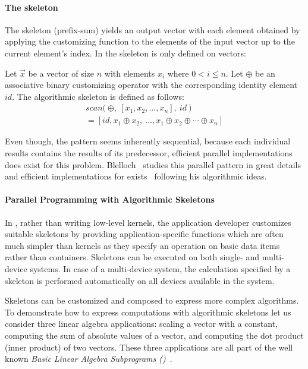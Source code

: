 \paragraph{The \scan skeleton}
The \scan skeleton (\aka prefix-sum) yields an output vector with each element obtained by applying the customizing function to the elements of the input vector up to the current element's index.
In \SkelCL the \scan skeleton is only defined on vectors:
\begin{definition}
  \label{definition:scan}
  Let $\vec{x}$ be a vector of size $n$ with elements $x_i$ where $0 < i \leq n$.
  Let $\oplus$ be an associative binary customizing operator with the corresponding identity element $id$.
  The algorithmic skeleton \scan is defined as follows:
  \begin{equation}
    \begin{split}
    scan \big(\ \oplus,\ [x_1, x_2, \dots, x_n],\ id\ \big) \\
      = [id, x_1 \oplus x_2,\ \dots,x_1 \oplus x_2 \oplus \cdots \oplus x_n]
    \end{split}
  \end{equation}
\end{definition}
\noindent
Even though, the \scan pattern seems inherently sequential, because each individual results contains the results of its predecessor, efficient parallel implementations does exist for this problem.
Blelloch~\cite{Blelloch1991} studies this parallel pattern in great details and efficient implementations for \GPUs exists~\cite{HarrisSeOw2007} following his algorithmic ideas.


\paragraph{Parallel Programming with Algorithmic Skeletons}
In \SkelCL, rather than writing low-level kernels, the application developer customizes suitable skeletons by providing application-specific functions which are often much simpler than kernels as they specify an operation on basic data items rather than containers.
Skeletons can be executed on both single- and multi-device systems.
In case of a multi-device system, the calculation specified by a skeleton is performed automatically on all devices available in the system.

Skeletons can be customized and composed to express more complex algorithms.
To demonstrate how to express computations with algorithmic skeletons let us consider three linear algebra applications:
scaling a vector with a constant, computing the sum of absolute values of a vector, and computing the dot product (\aka inner product) of two vectors.
These three applications are all part of the well known \emph{Basic Linear Algebra Subprograms (\BLAS)}~\cite{Dongarra2002,Dongarra2002a}.

